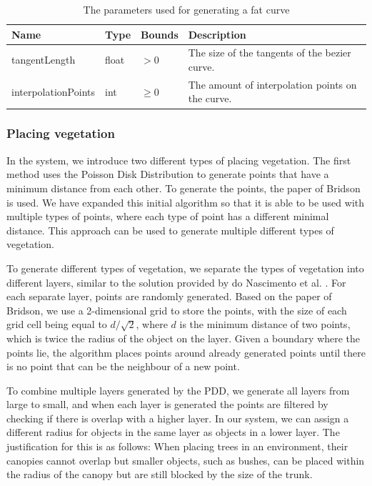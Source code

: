 \begin{table}[h!]
\begin{tabularx}{\linewidth}{|l|l|l|X|}
\hline
Name & Type & Bounds & Description\\
\hline

tangentLength & float & $> 0$ & The size of the tangents of the bezier curve. \\

interpolationPoints & int & $\geq 0$ & The amount of interpolation points on the curve. \\

\hline

\end{tabularx}
\caption{The parameters used for generating a fat curve}
\label{tab:river-fatcurve-parameters}
\end{table}

\subsubsection{Placing vegetation} \label{sec:architecture-vegetationplacement}
In the system, we introduce two different types of placing vegetation. The first method uses the Poisson Disk Distribution to generate points that have a minimum distance from each other. To generate the points, the paper of Bridson \cite{bridson_fast_2007} is used. We have expanded this initial algorithm so that it is able to be used with multiple types of points, where each type of point has a different minimal distance. This approach can be used to generate multiple different types of vegetation.

To generate different types of vegetation, we separate the types of vegetation into different layers, similar to the solution provided by do Nascimento et al. \cite{do_nascimento_gpu-based_2018}. For each separate layer, points are randomly generated. Based on the paper of Bridson, we use a 2-dimensional grid to store the points, with the size of each grid cell being equal to $d / \sqrt{2}$, where $d$ is the minimum distance of two points, which is twice the radius of the object on the layer. Given a boundary where the points lie, the algorithm places points around already generated points until there is no point that can be the neighbour of a new point.

To combine multiple layers generated by the PDD, we generate all layers from large to small, and when each layer is generated the points are filtered by checking if there is overlap with a higher layer. In our system, we can assign a different radius for objects in the same layer as objects in a lower layer. The justification for this is as follows: When placing trees in an environment, their canopies cannot overlap but smaller objects, such as bushes, can be placed within the radius of the canopy but are still blocked by the size of the trunk.

